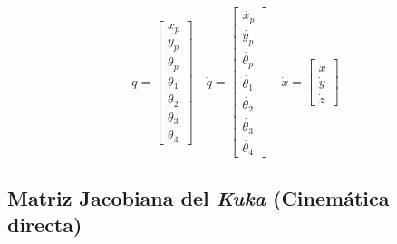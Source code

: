 \begin{equation*}
    q =
    \begin{bmatrix}
        x_p \\
        y_p \\
        \theta_p \\
        \theta_1 \\
        \theta_2 \\
        \theta_3 \\
        \theta_4
    \end{bmatrix}
    \quad
    \dot{q} =
    \begin{bmatrix}
        \dot{x_p} \\
        \dot{y_p} \\
        \dot{\theta_p} \\
        \dot{\theta_1} \\
        \dot{\theta_2} \\
        \dot{\theta_3} \\
        \dot{\theta_4}
    \end{bmatrix}
    \quad
    \dot{x} =
    \begin{bmatrix}
        \dot{x} \\
        \dot{y} \\
        \dot{z}
    \end{bmatrix}
\end{equation*}

\newpage
\subsection{Matriz Jacobiana del \emph{Kuka} (Cinemática directa)}

